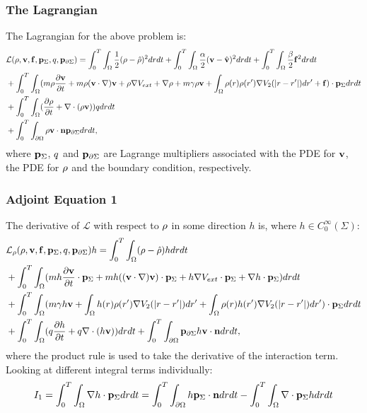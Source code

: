 \subsubsection*{The Lagrangian}
The Lagrangian for the above problem is:
\begin{align*}
&\mathcal{L}(\rho,\mathbf{v},\mathbf{f},\mathbf{p}_\Sigma,q,\mathbf{p}_{\partial \Sigma}) = \int_0^T \int_\Omega  \frac{1}{2}(\rho - \hat {\rho})^2 drdt +\int_0^T \int_\Omega  \frac{\alpha}{2}(\mathbf{v} - \hat {\mathbf{v}})^2 drdt +\int_0^T \int_\Omega  \frac{\beta}{2}\mathbf{f}^2 drdt\\
&+ \int_0^T \int_\Omega (m \rho \frac{\partial \mathbf{v}}{\partial t} + m \rho (\mathbf{v} \cdot \nabla)\mathbf{v} + \rho \nabla V_{ext} + \nabla \rho + m\gamma \rho \mathbf{v} +\int_\Omega \rho(r) \rho(r') \nabla V_2(|r-r'|)dr'+\mathbf{f}) \cdot \mathbf{p}_\Sigma dr dt\\
& + \int_0^T \int_\Omega (\frac{\partial \rho}{\partial t} + \nabla \cdot (\rho \mathbf{v})) q dr dt\\ 
& +\int_0^T \int_{\partial\Omega} \rho \mathbf{v} \cdot \mathbf{n} \mathbf{p}_{\partial \Sigma} dr dt,
\end{align*}
where $\mathbf{p}_\Sigma$, $q$ and $\mathbf{p}_{\partial \Sigma}$ are Lagrange multipliers associated with the PDE for $\mathbf{v}$, the PDE for $\rho$ and the boundary condition, respectively.
\subsubsection*{Adjoint Equation 1}

The derivative of $\mathcal{L}$ with respect to $\rho$ in some direction $h$ is, where ${h} \in C_0^\infty(\Sigma) $:
\begin{align*}
&\mathcal{L}_\rho(\rho,\mathbf{v},\mathbf{f},\mathbf{p}_\Sigma,q,\mathbf{p}_{\partial \Sigma})h = \int_0^T \int_\Omega  (\rho - \hat {\rho})h drdt \\
&+ \int_0^T \int_\Omega (m h \frac{\partial \mathbf{v}}{\partial t}\cdot \mathbf{p}_\Sigma + m h( (\mathbf{v} \cdot \nabla)\mathbf{v} )\cdot \mathbf{p}_\Sigma+ h\nabla V_{ext}\cdot \mathbf{p}_\Sigma + \nabla h\cdot \mathbf{p}_\Sigma)  dr dt\\
&+ \int_0^T \int_\Omega (m\gamma h \mathbf{v} +\int_\Omega h(r) \rho(r') \nabla V_2(|r-r'|)dr'+\int_\Omega \rho(r) h(r') \nabla V_2(|r-r'|)dr') \cdot \mathbf{p}_\Sigma dr dt\\
& + \int_0^T \int_\Omega (q\frac{\partial h}{\partial t} + q\nabla \cdot (h \mathbf{v}))  dr dt +\int_0^T \int_{\partial\Omega} \mathbf{p}_{\partial \Sigma} h\mathbf{v} \cdot \mathbf{n}  dr dt,
\end{align*}
where the product rule is used to take the derivative of the interaction term. Looking at different integral terms individually:
\begin{align*}
I_1= \int_0^T \int_\Omega \nabla h\cdot \mathbf{p}_\Sigma dr dt = \int_0^T \int_{\partial \Omega} h \mathbf{p}_\Sigma \cdot \mathbf{n} dr dt - \int_0^T \int_{\Omega} \nabla\cdot \mathbf{p}_\Sigma h dr dt
\end{align*}
 
